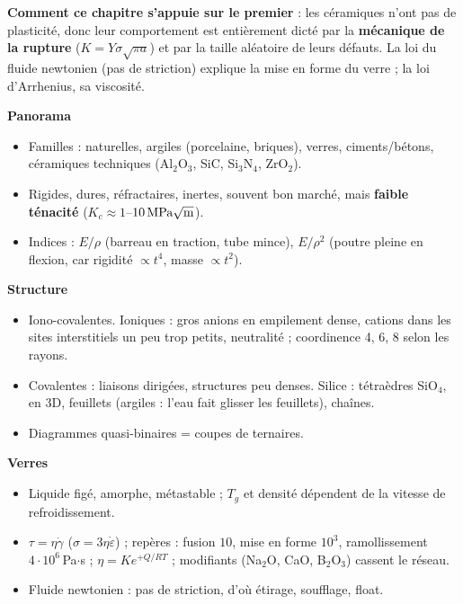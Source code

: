 \begin{recapbox}
\textbf{Comment ce chapitre s'appuie sur le premier} : les céramiques n'ont pas de plasticité,
donc leur comportement est entièrement dicté par la \textbf{mécanique de la rupture}
($K = Y\sigma\sqrt{\pi a}$) et par la taille aléatoire de leurs défauts. La loi du fluide newtonien
(pas de striction) explique la mise en forme du verre ; la loi d'Arrhenius, sa viscosité.

\textbf{Panorama}
\begin{itemize}
  \item Familles : naturelles, argiles (porcelaine, briques), verres, ciments/bétons,
        céramiques techniques (Al$_2$O$_3$, SiC, Si$_3$N$_4$, ZrO$_2$).
  \item Rigides, dures, réfractaires, inertes, souvent bon marché, mais \textbf{faible
        ténacité} ($K_c \approx 1$--$10\,\text{MPa}\sqrt{\text m}$).
  \item Indices : \textbf{$E/\rho$} (barreau en traction, tube mince), \textbf{$E/\rho^2$}
        (poutre pleine en flexion, car rigidité $\propto t^4$, masse $\propto t^2$).
\end{itemize}

\textbf{Structure}
\begin{itemize}
  \item Iono-covalentes. Ioniques : gros anions en empilement dense, cations dans les sites
        interstitiels \og un peu trop petits\fg{}, neutralité ; coordinence 4, 6, 8 selon les
        rayons.
  \item Covalentes : liaisons dirigées, structures peu denses. Silice : tétraèdres SiO$_4$, en
        3D, feuillets (argiles : l'eau fait glisser les feuillets), chaînes.
  \item Diagrammes quasi-binaires = coupes de ternaires.
\end{itemize}

\textbf{Verres}
\begin{itemize}
  \item Liquide figé, amorphe, métastable ; $T_g$ et densité dépendent de la vitesse de
        refroidissement.
  \item \textbf{$\tau = \eta\dot\gamma$} ($\sigma = 3\eta\dot\varepsilon$) ; repères : fusion
        $10$, mise en forme $10^3$, ramollissement $4\cdot10^6$\,Pa$\cdot$s ;
        $\eta = K e^{+Q/RT}$ ; modifiants (Na$_2$O, CaO, B$_2$O$_3$) cassent le réseau.
  \item Fluide newtonien : pas de striction, d'où étirage, soufflage, float.
\end{itemize}


\end{recapbox}
